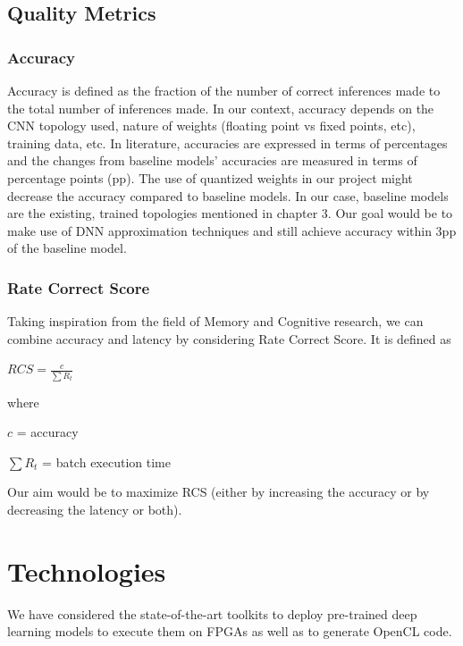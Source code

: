 \documentclass[titlepage]{report}
\begin{document}
\section{Quality Metrics}
\subsection{Accuracy}
Accuracy is defined as the fraction of the number of correct inferences made to the total number of inferences made. In our context, accuracy depends on the CNN topology used, nature of weights (floating point vs fixed points, etc), training data, etc. 
In literature, accuracies are expressed in terms of percentages and the changes from baseline models' accuracies are measured in terms of percentage points (pp). 
The use of quantized weights in our project might decrease the accuracy compared to baseline models. In our case, baseline models are the existing, trained topologies mentioned in chapter 3. Our goal would be to make use of DNN approximation techniques and still achieve accuracy within 3pp of the baseline model.


\subsection{Rate Correct Score}
Taking inspiration from the field of Memory and  Cognitive research, we can combine accuracy and latency by considering Rate Correct Score. It is defined as    

$RCS = \frac{c}{\sum R_t}$    

where   

$c$ = accuracy    

      $\sum R_t$ = batch execution time  
      
Our aim would be to maximize RCS (either by increasing the accuracy or by decreasing the latency or both).




\chapter{Technologies}
We have considered the state-of-the-art toolkits to deploy pre-trained deep learning models to execute them on FPGAs as well as to generate OpenCL code.
\end{document}
